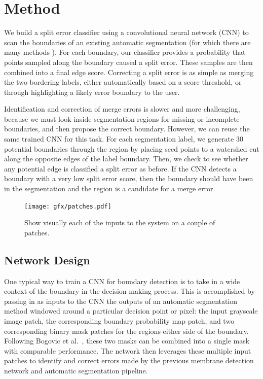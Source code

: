 \section{Method}
We build a split error classifier using a convolutional neural network (CNN) to scan the boundaries of an existing automatic segmentation (for which there are many methods \cite{jain2010,kaynig13,Liu2014,NunezIglesias2013Machine,GALA2014,amelio_segmentation}). For each boundary, our classifier provides a probability that points sampled along the boundary caused a split error. These samples are then combined into a final edge score. Correcting a split error is as simple as merging the two bordering labels, either automatically based on a score threshold, or through highlighting a likely error boundary to the user.

Identification and correction of merge errors is slower and more challenging, because we must look inside segmentation regions for missing or incomplete boundaries, and then propose the correct boundary. However, we can reuse the same trained CNN for this task. For each segmentation label, we generate 30 potential boundaries through the region by placing seed points to a watershed cut along the opposite edges of the label boundary. Then, we check to see whether any potential edge is classified a split error as before. If the CNN detects a boundary with a very low split error score, then the boundary should have been in the segmentation and the region is a candidate for a merge error.

\begin{figure}[t]
\centering
\texttt{[image: gfx/patches.pdf]}
\caption{Show visually each of the inputs to the system on a couple of patches.}
\end{figure}


\subsection{Network Design}
One typical way to train a CNN for boundary detection is to take in a wide context of the boundary in the decision making process. This is accomplished by passing in as inputs to the CNN the outputs of an automatic segmentation method windowed around a particular decision point or pixel: the input grayscale image patch, the corresponding boundary probability map patch, and two corresponding binary mask patches for the regions either side of the boundary. Following Bogovic et al.~\cite{BogovicHJ13}, these two masks can be combined into a single mask with comparable performance. The network then leverages these multiple input patches to identify and correct errors made by the previous membrane detection network and automatic segmentation pipeline.

